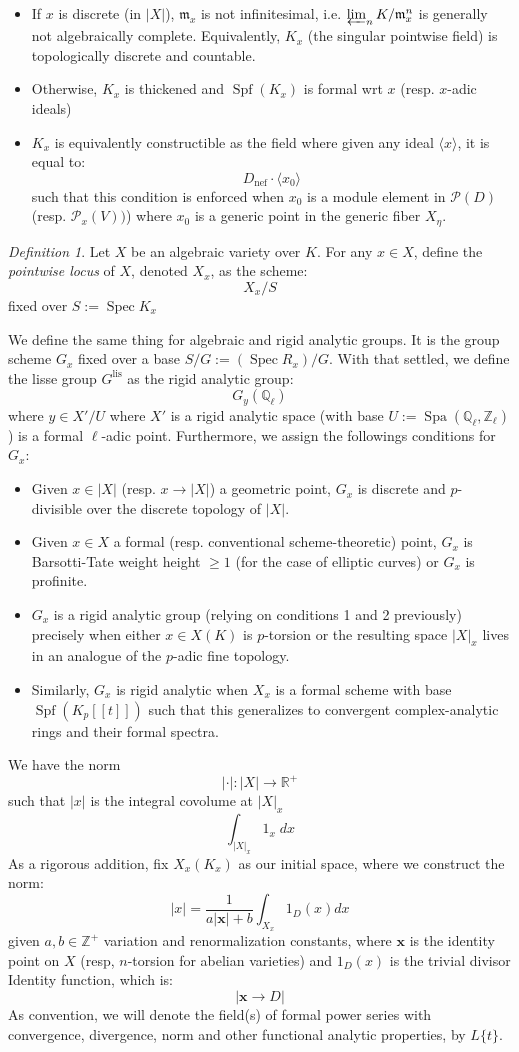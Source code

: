 \documentclass[9pt]{amsart}
\renewcommand{\[}{\begin{equation}}
\renewcommand{\]}{\end{equation}}
\newcommand{\on}{\operatorname}
\theoremstyle{plain}
\theoremstyle{remark}
\newtheorem{defin}[thm]{Definition}
\begin{document}
\begin{itemize}
\item If $x$ is discrete (in $|X|$), $\mathfrak{m}_x$ is not infinitesimal, i.e. $\varprojlim_n K/\mathfrak{m}^n_x$ is generally not algebraically complete. Equivalently, $K_x$ (the singular pointwise field) is topologically discrete and countable.
\item Otherwise, $K_x$ is thickened and $\on{Spf}(K_x)$ is formal wrt $x$ (resp. $x$-adic ideals)
\item $K_x$ is equivalently constructible as the field where given any ideal $\langle x \rangle$, it is equal to:
\[D_{\on{nef}} \cdot \langle x_0 \rangle\] 
such that this condition is enforced when $x_0$ is a module element in $\mathscr{P}(D)$ (resp. $\mathscr{P}_x(V))$)
where $x_0$ is a generic point in the generic fiber $X_{\eta}$.
\end{itemize} 
\begin{defin} 
Let $X$ be an algebraic variety over $K$. For any $x \in X$, define the \textit{pointwise locus} of $X$, denoted $X_x$, as the scheme:
\[X_x/S\]
fixed over $S := \on{Spec} K_x$
\end{defin}
We define the same thing for algebraic and rigid analytic groups. It is the group scheme $G_x$ fixed over a base $S/G := (\on{Spec} R_x)/G$. With that settled, we define the lisse group $G^{\on{lis}}$ as the rigid analytic group:
\[G_y(\mathbb{Q}_{\ell})\]
where $y \in X'/U$ where $X'$ is a rigid analytic space (with base $U := \on{Spa}(\mathbb{Q}_{\ell}, \mathbb{Z}_{\ell})$) is a formal $\ell$-adic point.
Furthermore, we assign the followings conditions for $G_x$:
\begin{itemize}
\item Given $x \in |X|$ (resp. $x \to |X|$) a geometric point, $G_x$ is discrete and $p$-divisible over the discrete topology of $|X|$.
\item Given $x \in X$ a formal (resp. conventional scheme-theoretic) point, $G_x$ is Barsotti-Tate weight height $\geq 1$ (for the case of elliptic curves) or $G_x$ is profinite.
\item $G_x$ is a rigid analytic group (relying on conditions 1 and 2 previously) precisely when either $x \in X(K)$ is $p$-torsion or the resulting space $|X|_x$ lives in an analogue of the $p$-adic fine topology.
\item Similarly, $G_x$ is rigid analytic when $X_x$ is a formal scheme with base $\on{Spf}(K_p[[t]])$ such that this generalizes to convergent complex-analytic rings and their formal spectra.
\end{itemize}
We have the norm
\[|\cdot|: |X| \to \mathbb{R}^+\]
such that $|x|$ is the integral covolume at $|X|_x$
\[\int_{|X|_x} 1_x \; dx\]
As a rigorous addition, fix $X_x(K_x)$ as our initial space, where we construct the norm:
\[|x| = \frac{1}{a|\mathbf{x}|+b} \int_{X_x} 1_D(x) dx\]
given $a,b \in \mathbb{Z}^+$ variation and renormalization constants,
where $\mathbf{x}$ is the identity point on $X$ (resp, $n$-torsion for abelian varieties) and $1_D(x)$ is the trivial divisor Identity function, which is: 
\[|\mathbf{x} \to D|\]
As convention, we will denote the field(s) of formal power series with convergence, divergence, norm and other functional analytic properties, by $L\{t\}$. 
\end{document}
